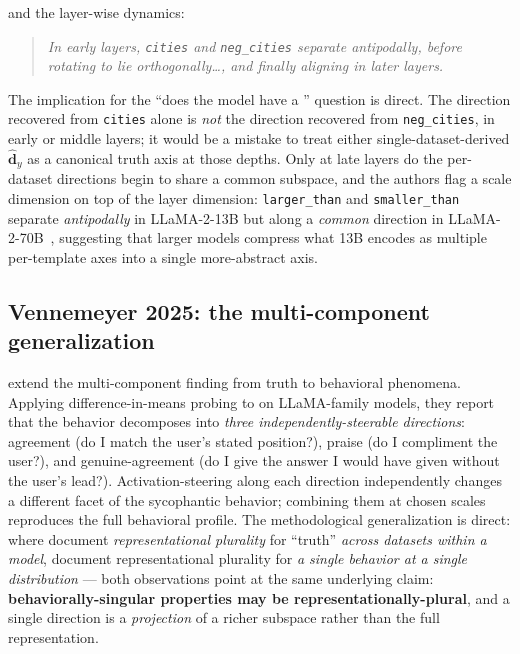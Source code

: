 \noindent and the layer-wise dynamics:

\begin{quote}
\itshape
In early layers, \texttt{cities} and \texttt{neg\_cities} separate
antipodally, before rotating to lie orthogonally\dots, and finally
aligning in later layers.~\citep[\S 4 / App.~C]{marks-tegmark-2023-truth}
\end{quote}

The implication for the ``does the model have a ''
question is direct. The  direction recovered from
\texttt{cities} alone is \emph{not} the  direction recovered from
\texttt{neg\_cities}, in early or middle layers; it would be a mistake
to treat either single-dataset-derived $\hat{\mathbf{d}}_y$ as a
canonical truth axis at those depths. Only at late layers do the
per-dataset directions begin to share a common subspace, and the
authors flag a scale dimension on top of the layer dimension:
\texttt{larger\_than} and \texttt{smaller\_than} separate
\emph{antipodally} in LLaMA-2-13B but along a \emph{common} direction
in LLaMA-2-70B~\citep[\S 4]{marks-tegmark-2023-truth}, suggesting that
larger models compress what 13B encodes as multiple per-template
axes into a single more-abstract axis.

\subsection{Vennemeyer 2025: the multi-component generalization}
\label{sec:vennemeyer-multicomponent}

\citet{vennemeyer2025-sycophancy-not-one-thing}
extend the multi-component finding from truth to behavioral
phenomena. Applying difference-in-means probing to  on
LLaMA-family models, they report that the behavior decomposes into
\emph{three independently-steerable directions}: agreement (do I
match the user's stated position?), praise (do I compliment the
user?), and genuine-agreement (do I give the answer I would have
given without the user's lead?). Activation-steering along each
direction independently changes a different facet of the sycophantic
behavior; combining them at chosen scales reproduces the full
behavioral profile. The methodological generalization is direct:
where \citeauthor{marks-tegmark-2023-truth} document
\emph{representational plurality} for ``truth'' \emph{across datasets
within a model}, \citeauthor{vennemeyer2025-sycophancy-not-one-thing}
document representational plurality for \emph{a single behavior at a
single distribution} --- both observations point at the same
underlying claim: \textbf{behaviorally-singular properties may be
representationally-plural}, and a single direction is a
\emph{projection} of a richer subspace rather than the full
representation.

